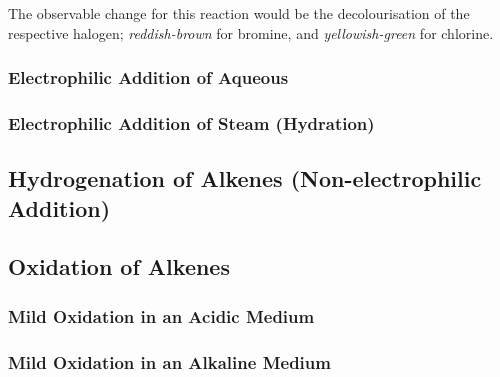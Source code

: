 		The observable change for this reaction would be the decolourisation of the respective halogen; \textit{\color{Mahogany}reddish-brown}
		for bromine, and \textit{\color{YellowGreen}yellowish-green} for chlorine.















	\subsubsection{Electrophilic Addition of Aqueous }



	\subsubsection{Electrophilic Addition of Steam (Hydration)}



\subsection{Hydrogenation of Alkenes (Non-electrophilic Addition)}




\subsection{Oxidation of Alkenes}

	\subsubsection{Mild Oxidation in an Acidic Medium}

	\subsubsection{Mild Oxidation in an Alkaline Medium}

